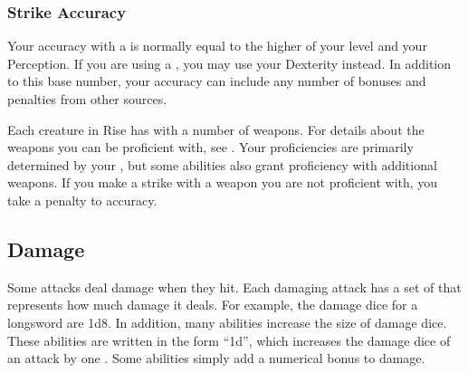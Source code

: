         \subsubsection{Strike Accuracy}\label{Strike Accuracy}
            Your accuracy with a  is normally equal to the higher of your level and your Perception.
            If you are using a , you may use your Dexterity instead.
            In addition to this base number, your accuracy can include any number of bonuses and penalties from other sources.

             Each creature in Rise has  with a number of weapons.
            For details about the weapons you can be proficient with, see .
            Your proficiencies are primarily determined by your , but some abilities also grant proficiency with additional weapons.
            If you make a strike with a weapon you are not proficient with, you take a  penalty to accuracy.

    \subsection{Damage}\label{Damage}
        Some attacks deal damage when they hit.
        Each damaging attack has a set of  that represents how much damage it deals.
        For example, the damage dice for a longsword are 1d8.
        In addition, many abilities increase the size of damage dice.
        These abilities are written in the form ``\plus1d'', which increases the damage dice of an attack by one .
        Some abilities simply add a numerical bonus to damage.


